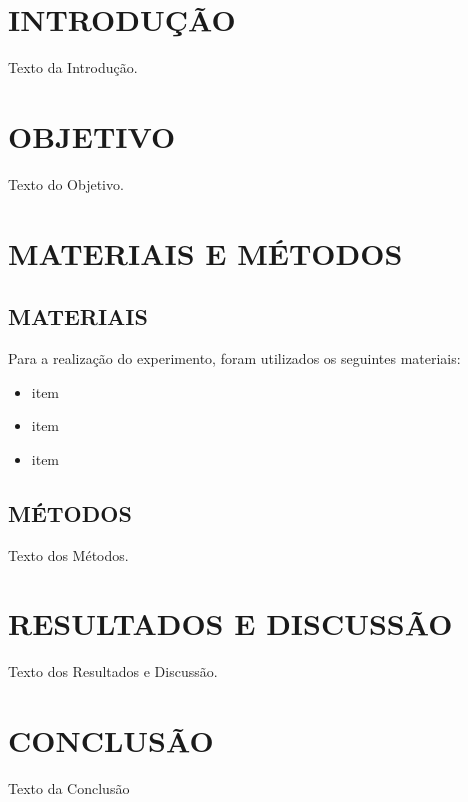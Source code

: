 \documentclass[12pt,a4paper]{article}
\begin{document}
\renewcommand{\tablename}{Tabela}
\renewcommand{\figurename}{Figura}

\thispagestyle{empty}

\clearpage

\thispagestyle{empty}

\clearpage

\newpage
\thispagestyle{empty}
\tableofcontents
\clearpage

\newpage
\setcounter{page}{3}
\section{INTRODUÇÃO}
Texto da Introdução.


\newpage
\section{OBJETIVO}
Texto do Objetivo.

\section{MATERIAIS E MÉTODOS}

\subsection{MATERIAIS}
Para a realização do experimento, foram utilizados os seguintes
materiais:

\begin{itemize}
    \item item
    \item item
    \item item
\end{itemize}

\subsection{MÉTODOS}
Texto dos Métodos.

\newpage
\section{RESULTADOS E DISCUSSÃO}
Texto dos Resultados e Discussão.

\newpage
\section{CONCLUSÃO}
Texto da Conclusão

\newpage

\nocite{vuolo1996erros}
\nocite{young2016fisica1}
\nocite{guia}

\begingroup
\setlength{\emergencystretch}{3em}
\sloppy
\printbibliography[
    heading=bibintoc,
    title={REFERÊNCIAS}
]
\endgroup
\end{document}
